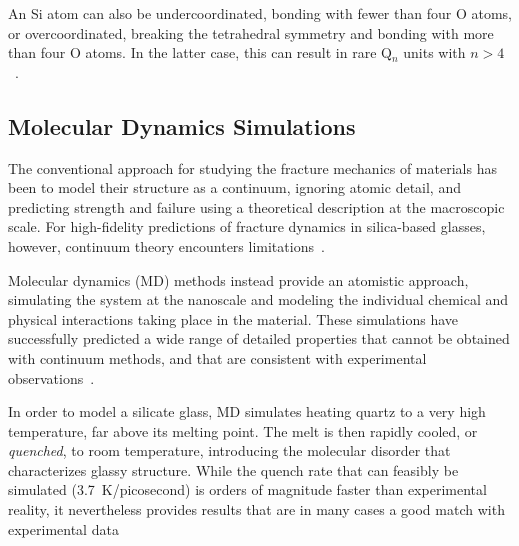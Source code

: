 An Si atom can also be undercoordinated, bonding with fewer than four O atoms, or overcoordinated, breaking the tetrahedral symmetry and bonding with more than four O atoms.  In the latter case, this can result in rare Q$_n$ units with $n>4$~\cite{pedone2015dynamics}.



\subsection{Molecular Dynamics Simulations} 

The conventional approach for studying the fracture mechanics of materials has been to model their structure as a continuum, ignoring atomic detail, and predicting strength and failure using a theoretical description at the macroscopic scale.  For high-fidelity predictions of fracture dynamics in silica-based glasses, however, continuum theory encounters limitations~\cite{shimada2015breakdown}.

Molecular dynamics (MD) methods instead provide an atomistic approach, simulating the system at the nanoscale and modeling the individual chemical and physical interactions taking place in the material. These simulations have successfully predicted a wide range of detailed properties that cannot be obtained with continuum methods, and that are consistent with experimental observations~\cite{pedone2009properties}.

In order to model a silicate glass, MD simulates heating quartz to a very high temperature, far above its melting point.  The melt is then rapidly cooled, or \emph{quenched}, to room temperature, introducing the molecular disorder that characterizes glassy structure.  While the quench rate that can feasibly be simulated (3.7~K/picosecond) is orders of magnitude faster than experimental reality, it nevertheless provides results that are in many cases a good match with experimental data~\cite{markpres,mWilson_continuum_stress}

